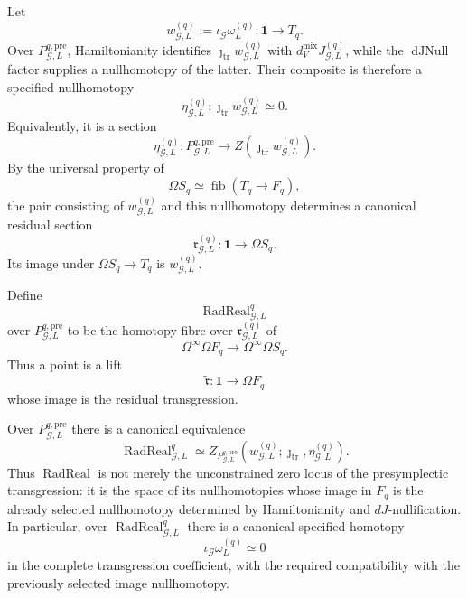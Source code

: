 \begin{construction}
\label{constr:symmetry-noether-residual-presymplectic-transgression}
Let
\[
w_{\mathcal G,L}^{(q)}
:=
\iota_{\mathcal G}\omega_L^{(q)}
:
\mathbf1\longrightarrow T_q.
\]
Over $P_{\mathcal G,L}^{q,\mathrm{pre}}$, Hamiltonianity identifies
$\jmath_{\mathrm{tr}}w_{\mathcal G,L}^{(q)}$ with
$d_V^{\mathrm{mix}}J_{\mathcal G,L}^{(q)}$, while the
$\operatorname{dJNull}$ factor supplies a nullhomotopy of the latter.
Their composite is therefore a specified nullhomotopy
\[
\eta_{\mathcal G,L}^{(q)}:
\jmath_{\mathrm{tr}}w_{\mathcal G,L}^{(q)}\simeq0.
\]
Equivalently, it is a section
\[
\eta_{\mathcal G,L}^{(q)}:
P_{\mathcal G,L}^{q,\mathrm{pre}}
\longrightarrow
Z\!\left(\jmath_{\mathrm{tr}}w_{\mathcal G,L}^{(q)}\right).
\]
By the universal property of
\[
\Omega S_q\simeq\operatorname{fib}
\left(
T_q\to F_q
\right),
\]
the pair consisting of $w_{\mathcal G,L}^{(q)}$ and this nullhomotopy determines
a canonical residual section
\[
\boxed{
\mathfrak r_{\mathcal G,L}^{(q)}:
\mathbf1
\longrightarrow
\Omega S_q.
}
\]
Its image under $\Omega S_q\to T_q$ is
$w_{\mathcal G,L}^{(q)}$.
\end{construction}

\begin{definition}
\label{def:symmetry-noether-presymplectic-radical-realization}
Define
\[
\boxed{
\operatorname{RadReal}_{\mathcal G,L}^{q}
}
\]
over $P_{\mathcal G,L}^{q,\mathrm{pre}}$ to be the homotopy fibre over
$\mathfrak r_{\mathcal G,L}^{(q)}$ of
\[
\Omega^\infty\Omega F_q
\longrightarrow
\Omega^\infty\Omega S_q.
\]
Thus a point is a lift
\[
\widetilde{\mathfrak r}:
\mathbf1\longrightarrow\Omega F_q
\]
whose image is the residual transgression.
\end{definition}

\begin{theorem}
\label{thm:symmetry-noether-radical-realization-is-the-compatible-missing-nullification}
Over $P_{\mathcal G,L}^{q,\mathrm{pre}}$ there is a canonical equivalence
\[
\boxed{
\operatorname{RadReal}_{\mathcal G,L}^{q}
\simeq
Z_{P_{\mathcal G,L}^{q,\mathrm{pre}}}
\left(
 w_{\mathcal G,L}^{(q)};
 \jmath_{\mathrm{tr}},
 \eta_{\mathcal G,L}^{(q)}
\right).
}
\]
Thus $\operatorname{RadReal}$ is not merely the unconstrained zero locus of the
presymplectic transgression: it is the space of its nullhomotopies whose image in
$F_q$ is the already selected nullhomotopy determined by Hamiltonianity and
$dJ$-nullification.  In particular, over
$\operatorname{RadReal}_{\mathcal G,L}^{q}$ there is a canonical specified
homotopy
\[
\boxed{
\iota_{\mathcal G}\omega_L^{(q)}\simeq0
}
\]
in the complete transgression coefficient, with the required compatibility with
the previously selected image nullhomotopy.
\end{theorem}

